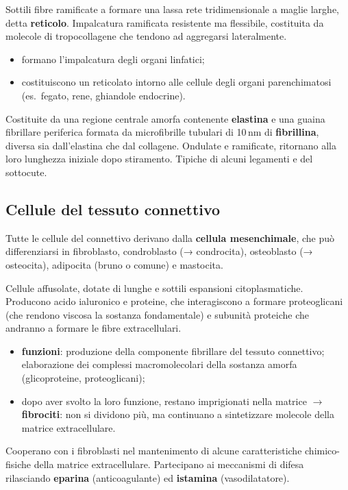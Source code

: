 Sottili fibre ramificate a formare una lassa rete tridimensionale a maglie larghe, detta \textbf{reticolo}. Impalcatura ramificata resistente ma flessibile, costituita da molecole di tropocollagene che tendono ad aggregarsi lateralmente.
\begin{itemize}
  \item formano l'impalcatura degli organi linfatici;
  \item costituiscono un reticolato intorno alle cellule degli organi parenchimatosi (es.\ fegato, rene, ghiandole endocrine).
\end{itemize}

Costituite da una regione centrale amorfa contenente \textbf{elastina} e una guaina fibrillare periferica formata da microfibrille tubulari di 10\,nm di \textbf{fibrillina}, diversa sia dall'elastina che dal collagene. Ondulate e ramificate, ritornano alla loro lunghezza iniziale dopo stiramento. Tipiche di alcuni legamenti e del sottocute.

\subsection{Cellule del tessuto connettivo}

Tutte le cellule del connettivo derivano dalla \textbf{cellula mesenchimale}, che può differenziarsi in fibroblasto, condroblasto (→ condrocita), osteoblasto (→ osteocita), adipocita (bruno o comune) e mastocita.

Cellule affusolate, dotate di lunghe e sottili espansioni citoplasmatiche. Producono acido ialuronico e proteine, che interagiscono a formare proteoglicani (che rendono viscosa la sostanza fondamentale) e subunità proteiche che andranno a formare le fibre extracellulari.
\begin{itemize}
  \item \textbf{funzioni}: produzione della componente fibrillare del tessuto connettivo; elaborazione dei complessi macromolecolari della sostanza amorfa (glicoproteine, proteoglicani);
  \item dopo aver svolto la loro funzione, restano imprigionati nella matrice $\rightarrow$ \textbf{fibrociti}: non si dividono più, ma continuano a sintetizzare molecole della matrice extracellulare.
\end{itemize}

Cooperano con i fibroblasti nel mantenimento di alcune caratteristiche chimico-fisiche della matrice extracellulare. Partecipano ai meccanismi di difesa rilasciando \textbf{eparina} (anticoagulante) ed \textbf{istamina} (vasodilatatore).

